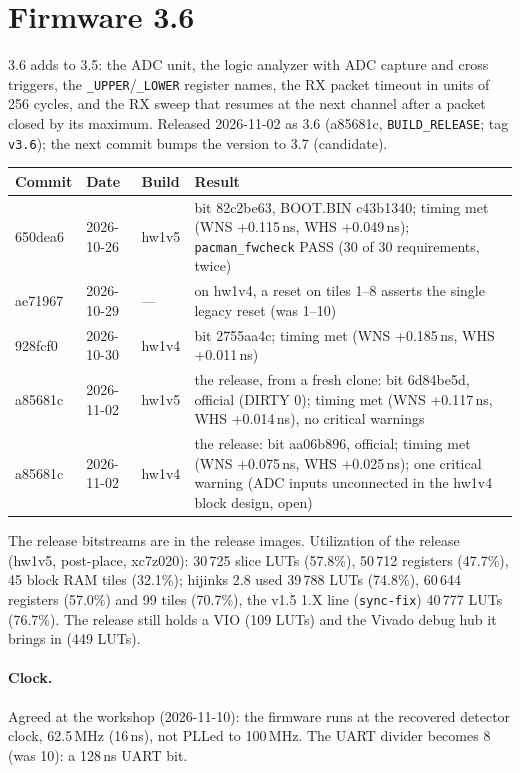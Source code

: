 \documentclass[11pt]{article}
\newcommand{\br}[1]{\texttt{#1}}
\newcommand{\h}[1]{\texttt{#1}}
\begin{document}
\section{Firmware 3.6}

3.6 adds to 3.5: the ADC unit, the logic analyzer with ADC capture and cross triggers, the \h{\_UPPER}/\h{\_LOWER}
register names, the RX packet timeout in units of 256 cycles, and the RX sweep that resumes at the next channel after
a packet closed by its maximum.  Released 2026-11-02 as 3.6 (a85681c, \h{BUILD\_RELEASE}; tag \br{v3.6}); the
next commit bumps the version to 3.7 (candidate).

\begin{center}
\begin{tabularx}{\linewidth}{@{}lllL@{}}
\toprule
Commit & Date & Build & Result \\
\midrule
650dea6 & 2026-10-26 & hw1v5 & bit 82c2be63, BOOT.BIN c43b1340; timing met (WNS +0.115\,ns, WHS +0.049\,ns);
  \h{pacman\_fwcheck} PASS (30 of 30 requirements, twice) \\
ae71967 & 2026-10-29 & --- & on hw1v4, a reset on tiles 1--8 asserts the single legacy reset (was 1--10) \\
928fcf0 & 2026-10-30 & hw1v4 & bit 2755aa4c; timing met (WNS +0.185\,ns, WHS +0.011\,ns) \\
a85681c & 2026-11-02 & hw1v5 & the release, from a fresh clone: bit 6d84be5d, official (DIRTY 0); timing met
  (WNS +0.117\,ns, WHS +0.014\,ns), no critical warnings \\
a85681c & 2026-11-02 & hw1v4 & the release: bit aa06b896, official; timing met (WNS +0.075\,ns, WHS +0.025\,ns);
  one critical warning (ADC inputs unconnected in the hw1v4 block design, open) \\
\bottomrule
\end{tabularx}
\end{center}

\noindent The release bitstreams are in the release images.  Utilization of the release (hw1v5, post-place,
xc7z020): 30\,725 slice LUTs (57.8\%), 50\,712 registers (47.7\%), 45 block RAM tiles (32.1\%); hijinks 2.8 used
39\,788 LUTs (74.8\%), 60\,644 registers (57.0\%) and 99 tiles (70.7\%), the v1.5 1.X line (\br{sync-fix}) 40\,777
LUTs (76.7\%).  The release still holds a VIO (109 LUTs) and the Vivado debug hub it brings in (449 LUTs).

\paragraph{Clock.}  Agreed at the workshop (2026-11-10):  the firmware runs at the recovered detector clock,
62.5\,MHz (16\,ns), not PLLed to 100\,MHz.  The UART divider becomes 8 (was 10):  a 128\,ns UART bit.
\end{document}
